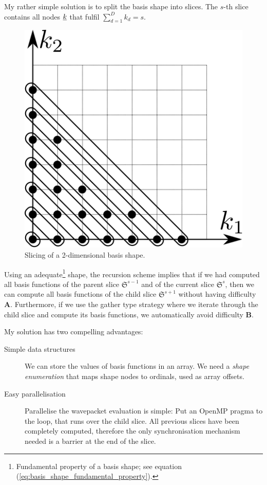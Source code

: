 \documentclass{article}
\begin{document}
My rather simple solution is to split the basis shape into slices.  The
\(s\)-th slice contains all nodes \(\underline{k}\) that fulfil
\( \sum_{d=1}^{D} k_d = s \).

\begin{figure}[H]
  \centering
  \includegraphics{shape_slicing}
  \caption{Slicing of a 2-dimensional basis shape.}
\end{figure}

Using an adequate\footnote{Fundamental property of a basis shape; see equation 
  (\ref{eq:basis_shape_fundamental_property}).} shape, 
the recursion scheme implies that if we had computed all basis
functions of the parent slice \( \mathfrak{S}^{s-1} \) and of the current
slice \( \mathfrak{S}^{s} \), then we can compute all basis functions of
the child slice \( \mathfrak{S}^{s+1} \) without having difficulty
\textbf{A}. Furthermore, if we use the gather type strategy where we
iterate through the child slice and compute its basis functions, we
automatically avoid difficulty \textbf{B}.

My solution has two compelling advantages:
\begin{description}
\item[Simple data structures] We can store the values of basis functions in
  an array. We need a \emph{shape enumeration}
  that maps shape nodes to ordinals, used as array offsets.
\item[Easy parallelisation] Parallelise the wavepacket evaluation is simple:
  Put an OpenMP pragma to the loop, that runs over the child slice.
  All previous slices have been completely computed,
  therefore the only synchronisation mechanism
  needed is a barrier at the end of the slice.
\end{description}
\end{document}
